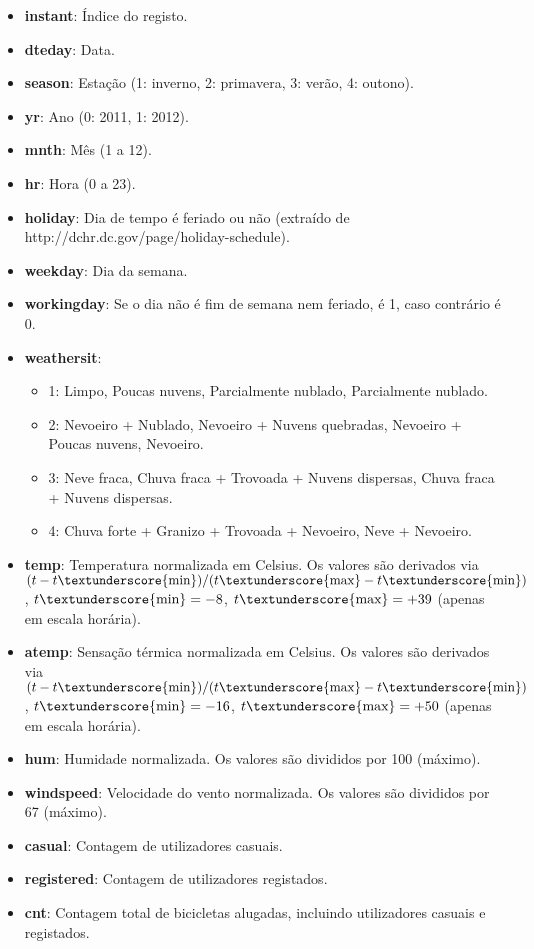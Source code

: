 \documentclass[
  letterpaper,
  DIV=11,
  numbers=noendperiod]{scrartcl}
\begin{document}
\begin{itemize}
  \item \textbf{instant}: Índice do registo.
  \item \textbf{dteday}: Data.
  \item \textbf{season}: Estação (1: inverno, 2: primavera, 3: verão, 4: outono).
  \item \textbf{yr}: Ano (0: 2011, 1: 2012).
  \item \textbf{mnth}: Mês (1 a 12).
  \item \textbf{hr}: Hora (0 a 23).
  \item \textbf{holiday}: Dia de tempo é feriado ou não (extraído de http://dchr.dc.gov/page/holiday-schedule).
  \item \textbf{weekday}: Dia da semana.
  \item \textbf{workingday}: Se o dia não é fim de semana nem feriado, é 1, caso contrário é 0.
  \item \textbf{weathersit}:
    \begin{itemize}
      \item 1: Limpo, Poucas nuvens, Parcialmente nublado, Parcialmente nublado.
      \item 2: Nevoeiro + Nublado, Nevoeiro + Nuvens quebradas, Nevoeiro + Poucas nuvens, Nevoeiro.
      \item 3: Neve fraca, Chuva fraca + Trovoada + Nuvens dispersas, Chuva fraca + Nuvens dispersas.
      \item 4: Chuva forte + Granizo + Trovoada + Nevoeiro, Neve + Nevoeiro.
    \end{itemize}
  \item \textbf{temp}: Temperatura normalizada em Celsius. Os valores são derivados via $(t - t\textunderscore{\text{min}})/(t\textunderscore{\text{max}} - t\textunderscore{\text{min}})$, $t\textunderscore{\text{min}}=-8$, $t\textunderscore{\text{max}}=+39$ (apenas em escala horária).
  \item \textbf{atemp}: Sensação térmica normalizada em Celsius. Os valores são derivados via $(t - t\textunderscore{\text{min}})/(t\textunderscore{\text{max}} - t\textunderscore{\text{min}})$, $t\textunderscore{\text{min}}=-16$, $t\textunderscore{\text{max}}=+50$ (apenas em escala horária).
  \item \textbf{hum}: Humidade normalizada. Os valores são divididos por 100 (máximo).
  \item \textbf{windspeed}: Velocidade do vento normalizada. Os valores são divididos por 67 (máximo).
  \item \textbf{casual}: Contagem de utilizadores casuais.
  \item \textbf{registered}: Contagem de utilizadores registados.
  \item \textbf{cnt}: Contagem total de bicicletas alugadas, incluindo utilizadores casuais e registados.
\end{itemize}
\end{document}
